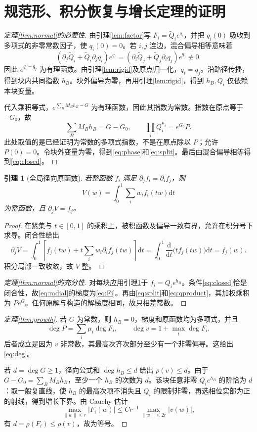 \documentclass[UTF8,11pt,a4paper,fontset=fandol]{ctexart}
\newtheorem{lemma}[theorem]{引理}
\theoremstyle{definition}\newtheorem{definition}[theorem]{定义}
\theoremstyle{remark}\newtheorem{remark}[theorem]{注}
\newcommand{\dd}{\mathrm d}\newcommand{\OO}{\mathcal O}
\begin{document}
\section{规范形、积分恢复与增长定理的证明}
\begin{proof}[定理\ref{thm:normal}的必要性]
由引理\ref{lem:factor}写 $F_i=\widetilde Q_i e^{q_i}$，并把 $q_i(0)$ 吸收到多项式的非零常数因子，使 $q_i(0)=0$。若 $i,j$ 连边，混合偏导相等意味着
\[
(\partial_j\widetilde Q_i+\widetilde Q_i\partial_jq_i)e^{q_i}
=(\partial_i\widetilde Q_j+\widetilde Q_j\partial_iq_j)e^{q_j}\not\equiv0.
\]
因此 $e^{q_i-q_j}$ 为有理函数。由引理\ref{lem:rigid}及原点归一化，$q_i=q_j$。沿路径传播，得到块内共同指数 $h_B$。块外偏导为零，再用引理\ref{lem:rigid}，得到 $h_B,Q_i$ 仅依赖本块变量。

代入乘积等式，$e^{\sum_BM_Bh_B-G}$ 为有理函数，因此其指数为常数。指数在原点等于 $-G_0$，故
\[
\sum_BM_Bh_B=G-G_0,\qquad \prod_iQ_i^{\mu_i}=e^{G_0}P.
\]
此处取值的是已经证明为常数的多项式指数，不是在原点除以 $P$；允许 $P(0)=0$。令块外变量为零，得到\eqref{eq:phase}和\eqref{eq:split}。最后由混合偏导相等得到\eqref{eq:closed}。
\end{proof}

\begin{lemma}[全局径向原函数]\label{lem:radial}
若整函数 $f_i$ 满足 $\partial_jf_i=\partial_if_j$，则
\[
V(w)=\int_0^1\sum_i w_i f_i(tw)\dd t
\]
为整函数，且 $\partial_jV=f_j$。
\end{lemma}
\begin{proof}
在紧集与 $t\in[0,1]$ 的乘积上，被积函数及偏导一致有界，允许在积分号下求导。闭合性给出
\[
\partial_jV=\int_0^1\left[f_j(tw)+t\sum_iw_i\partial_if_j(tw)\right]\dd t
=\int_0^1\frac{\dd}{\dd t}\bigl(tf_j(tw)\bigr)\dd t=f_j(w).
\]
积分局部一致收敛，故 $V$ 整。
\end{proof}

\begin{proof}[定理\ref{thm:normal}的充分性]
对每块应用引理\ref{lem:radial}于 $f_i=Q_i e^{h_B}$。条件\eqref{eq:closed}恰是闭合性，故\eqref{eq:radial}的梯度为\eqref{eq:Fi}。再由\eqref{eq:split}和\eqref{eq:qproduct}，其加权乘积为 $Pe^G$。任何原解与构造的解梯度相同，故只相差常数。
\end{proof}

\begin{proof}[定理\ref{thm:growth}]
若 $G$ 为常数，则 $h_B=0$，梯度和原函数均为多项式，并且
\[
\deg P=\sum_i\mu_i\deg F_i,\qquad \deg v=1+\max_i\deg F_i.
\]
后者成立是因为 $v$ 非常数，其最高次齐次部分至少有一个非零偏导。这给出\eqref{eq:deg}。

若 $d=\deg G\ge1$，径向公式和 $\deg h_B\le d$ 给出 $\rho(v)\le d$。由于 $G-G_0=\sum_BM_Bh_B$，至少一个 $h_B$ 的次数为 $d$。该块任意非零 $Q_i e^{h_B}$ 的阶恰为 $d$：取一般复直线，使 $h_B$ 的最高次项不消失且 $Q_i$ 的限制非零，再选相位实部为正的射线，得到增长下界。由 Cauchy 估计
\[
\max_{\|w\|\le r}|F_i(w)|\le C r^{-1}\max_{\|w\|\le2r}|v(w)|,
\]
有 $d=\rho(F_i)\le\rho(v)$，故为等号。
\end{proof}
\end{document}
